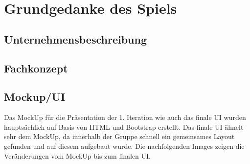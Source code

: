 \clearpage
\chapter{Grundgedanke des Spiels}
\section{Unternehmensbeschreibung}

\section{Fachkonzept}
\section{Mockup/UI}
Das MockUp für die Präsentation der 1. Iteration wie auch das finale UI wurden hauptsächlich auf Basis von HTML und Bootstrap erstellt. Das finale UI ähnelt sehr dem MockUp, da innerhalb der Gruppe schnell ein gemeinsames Layout gefunden und auf diesem aufgebaut wurde. Die nachfolgenden Images zeigen die Veränderungen vom MockUp bis zum finalen UI.  

